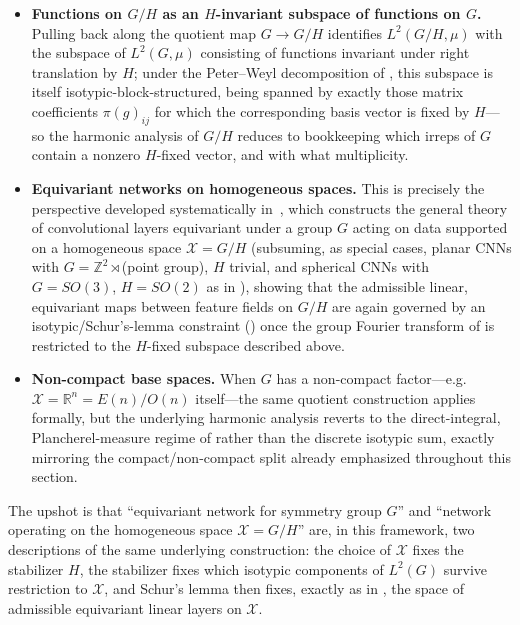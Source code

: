 \documentclass[mathematics,review,submit,moreauthors]{Definitions/mdpi}
\begin{document}
\begin{itemize}
    \item \textbf{Functions on $G/H$ as an $H$-invariant subspace of
    functions on $G$.} Pulling back along the quotient map $G \to G/H$
    identifies $L^2(G/H,\mu)$ with the subspace of $L^2(G,\mu)$ consisting
    of functions invariant under right translation by $H$; under the
    Peter--Weyl decomposition of
    , this subspace is itself
    isotypic-block-structured, being spanned by exactly those matrix
    coefficients $\pi(g)_{ij}$ for which the corresponding basis vector is
    fixed by $H$---so the harmonic analysis of $G/H$ reduces to bookkeeping
    which irreps of $G$ contain a nonzero $H$-fixed vector, and with what
    multiplicity.
    \item \textbf{Equivariant networks on homogeneous spaces.} This is
    precisely the perspective developed systematically
    in~\citet{cohen2019anips}, which constructs the general theory of
    convolutional layers equivariant under a group $G$ acting on data
    supported on a homogeneous space $\mathcal{X} = G/H$ (subsuming, as special cases,
    planar CNNs with $G = \mathbb{Z}^2 \rtimes$(point group), $H$ trivial,
    and spherical CNNs with $G = SO(3)$, $H = SO(2)$ as in
    ), showing that the admissible
    linear, equivariant maps between feature fields on $G/H$ are again
    governed by an isotypic/Schur's-lemma constraint
    () once the group Fourier transform
    of  is restricted to the
    $H$-fixed subspace described above.
    \item \textbf{Non-compact base spaces.} When $G$ has a non-compact
    factor---e.g.\ $\mathcal{X} = \mathbb{R}^n = E(n)/O(n)$ itself---the same
    quotient construction applies formally, but the underlying harmonic
    analysis reverts to the direct-integral, Plancherel-measure regime of
     rather than the discrete
    isotypic sum, exactly mirroring the compact/non-compact split already
    emphasized throughout this section.
\end{itemize}

The upshot is that ``equivariant network for symmetry group $G$'' and
``network operating on the homogeneous space $\mathcal{X} = G/H$'' are, in this
framework, two descriptions of the same underlying construction: the choice
of $\mathcal{X}$ fixes the stabilizer $H$, the stabilizer fixes which isotypic
components of $L^2(G)$ survive restriction to $\mathcal{X}$, and Schur's lemma then
fixes, exactly as in , the space of
admissible equivariant linear layers on $\mathcal{X}$.
\end{document}
